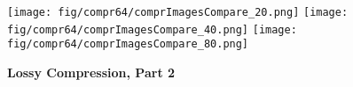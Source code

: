 \documentclass{article}
\begin{document}
\begin{figure*} \centering
\texttt{[image: fig/compr64/comprImagesCompare\_20.png]}
\texttt{[image: fig/compr64/comprImagesCompare\_40.png]}
\texttt{[image: fig/compr64/comprImagesCompare\_80.png]}
\caption{\textbf{Lossy Compression, Part 2}}
\label{fig:compression64b}
\end{figure*}
\end{document}
